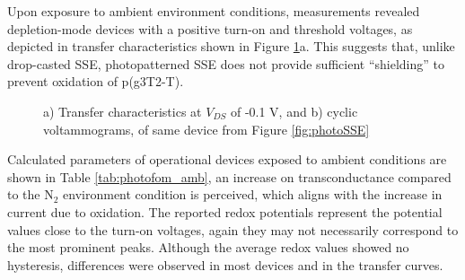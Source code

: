 Upon exposure to ambient environment conditions, measurements revealed depletion-mode devices with a positive turn-on and threshold voltages, as depicted in transfer characteristics shown in Figure \ref{fig:photoSSEair}a. This suggests that, unlike drop-casted SSE, photopatterned SSE does not provide sufficient ``shielding'' to prevent oxidation of p(g3T2-T). 

\begin{figure}[ht]
    \centering
    \caption[Performance of solid-OECT with photolithographed SSE in ambient conditions]{a) Transfer characteristics at $V_{DS}$ of -0.1 V, and b) cyclic voltammograms, of same device from Figure \ref{fig:photoSSE}}
    \label{fig:photoSSEair}
\end{figure}

Calculated parameters of operational devices exposed to ambient conditions are shown in Table \ref{tab:photofom_amb}, an increase on transconductance compared to the N$_{2}$ environment condition is perceived, which aligns with the increase in current due to oxidation. The reported redox potentials represent the potential values close to the turn-on voltages, again they may not necessarily correspond to the most prominent peaks. Although the average redox values showed no hysteresis, differences were observed in most devices and in the transfer curves. 


